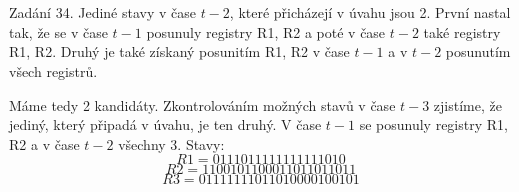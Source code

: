 \documentclass[12pt, a4paper]{article}
\begin{document}
\section{}
Zadání 34. Jediné stavy v čase $t-2$, které přicházejí v úvahu jsou 2. První nastal tak, že se v čase $t-1$ posunuly registry R1, R2 a poté v čase $t-2$ také registry R1, R2. Druhý je také získaný posunitím R1, R2 v čase $t-1$ a v $t-2$ posunutím všech registrů.

Máme tedy 2 kandidáty. Zkontrolováním možných stavů v čase $t-3$ zjistíme, že jediný, který připadá v úvahu, je ten druhý. V čase $t-1$ se posunuly registry R1, R2 a v čase $t-2$ všechny 3. Stavy:
$$R1 = 0111011111111111010$$
$$R2 = 1100101100011011011011$$
$$R3 = 01111111011010000100101$$
\end{document}
